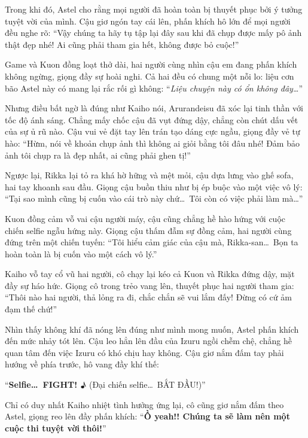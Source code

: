 \documentclass[../main.tex]{subfiles}
\begin{document}
Trong khi đó, Astel cho rằng mọi người đã hoàn toàn bị thuyết phục bởi ý tưởng tuyệt vời của mình. Cậu giơ ngón tay cái lên, phấn khích hô lớn để mọi người đều nghe rõ: ``Vậy chúng ta hãy tụ tập lại đây sau khi đã chụp được mấy pô ảnh thật đẹp nhé! Ai cũng phải tham gia hết, không được bỏ cuộc!''

Game và Kuon đồng loạt thở dài, hai người cùng nhìn cậu em đang phấn khích không ngừng, giọng đầy sự hoài nghi. Cả hai đều có chung một nỗi lo: liệu cơn bão Astel này có mang lại rắc rối gì không: ``\textit{Liệu chuyện này có ổn không đây\dots}''

Nhưng điều bất ngờ là đúng như Kaiho nói, Arurandeisu đã xóc lại tinh thần với tốc độ ánh sáng. Chẳng mấy chốc cậu đã vụt đứng dậy, chẳng còn chút dấu vết của sự ủ rũ nào. Cậu vui vẻ đặt tay lên trán tạo dáng cực ngầu, giọng đầy vẻ tự hào: ``Hừm, nói về khoản chụp ảnh thì không ai giỏi bằng tôi đâu nhé! Đảm bảo ảnh tôi chụp ra là đẹp nhất, ai cũng phải ghen tị!''

Ngược lại, Rikka lại tỏ ra khá hờ hững và mệt mỏi, cậu dựa lưng vào ghế sofa, hai tay khoanh sau đầu. Giọng cậu buồn thiu như bị ép buộc vào một việc vô lý: ``Tại sao mình cũng bị cuốn vào cái trò này chứ\dots\ Tôi còn có việc phải làm mà\dots''

Kuon đồng cảm vỗ vai cậu người máy, cậu cũng chẳng hề hào hứng với cuộc chiến selfie ngẫu hứng này. Giọng cậu thấm đẫm sự đồng cảm, hai người cùng đứng trên một chiến tuyến: ``Tôi hiểu cảm giác của cậu mà, Rikka-san\dots\ Bọn ta hoàn toàn là bị cuốn vào một cách vô lý.''

Kaiho vỗ tay cổ vũ hai người, cô chạy lại kéo cả Kuon và Rikka đứng dậy, mặt đầy sự háo hức. Giọng cô trong trẻo vang lên, thuyết phục hai người tham gia: ``Thôi nào hai người, thả lỏng ra đi, chắc chắn sẽ vui lắm đấy! Đừng có cứ ảm đạm thế chứ!''

Nhìn thấy không khí đã nóng lên đúng như mình mong muốn, Astel phấn khích đến mức nhảy tót lên. Cậu leo hẳn lên đầu của Izuru ngồi chễm chệ, chẳng hề quan tâm đến việc Izuru có khó chịu hay không. Cậu giơ nắm đấm tay phải hướng về phía trước, hô vang đầy khí thế:

``\textbf{Selfie\dots\ FIGHT! ♪} (Đại chiến selfie\dots\ BẮT ĐẦU!)''


Chỉ có duy nhất Kaiho nhiệt tình hưởng ứng lại, cô cũng giơ nắm đấm theo Astel, giọng reo lên đầy phấn khích: ``\textbf{Ồ yeah!! Chúng ta sẽ làm nên một cuộc thi tuyệt vời thôi!}''
\end{document}
